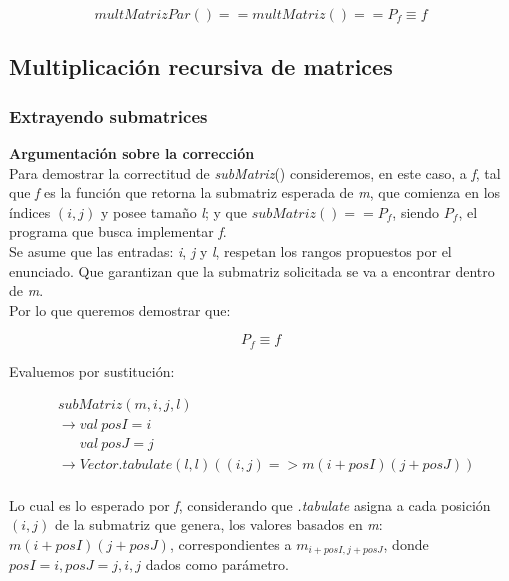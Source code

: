 \documentclass{article}
\begin{document}
\begin{equation*}
    multMatrizPar() == multMatriz() == P_f \equiv f
\end{equation*}

\subsection{Multiplicación recursiva de matrices}
\subsubsection{Extrayendo submatrices}

\textbf{Argumentación sobre la corrección}\\

Para demostrar la correctitud de \textit{subMatriz}() consideremos, en este caso, a \textit{f}, tal que \textit{f} es la función que retorna la submatriz esperada de \textit{m}, que comienza en los índices \((i,j)\) y posee tamaño \textit{l}; y que \(subMatriz() == P_f\), siendo \(P_f\), el programa que busca implementar \textit{f}.\\

Se asume que las entradas: \textit{i}, \textit{j} y \textit{l}, respetan los rangos propuestos por el enunciado. Que garantizan que la submatriz solicitada se va a encontrar dentro de \textit{m}.\\

Por lo que queremos demostrar que:

\begin{equation*}
    P_f \equiv f
\end{equation*}

Evaluemos por sustitución:

\begin{align*}
    &subMatriz(m, i, j, l)\\
    &\rightarrow val \ posI = i\\
    &\quad \; \; val \ posJ = j\\
    &\rightarrow Vector.tabulate(l,l)((i,j) => m(i+posI)(j+posJ))\\
\end{align*}

Lo cual es lo esperado por \textit{f}, considerando que \textit{.tabulate} asigna a cada posición \((i,j)\) de la submatriz que genera, los valores basados en \textit{m}: \(m(i+posI)(j+posJ)\), correspondientes a \(m_{i+posI,j+posJ}\), donde \(posI = i, posJ = j, i,j\) dados como parámetro.\\
\end{document}
